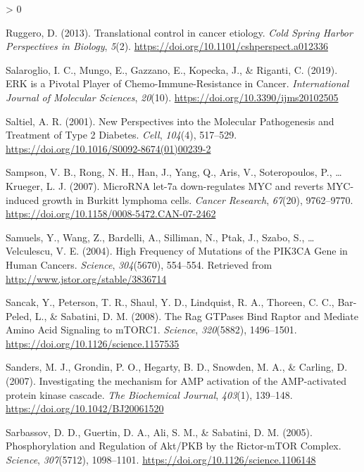 \documentclass[
  12pt,
  openany]{book}
\newlength{\cslhangindent}
\newenvironment{CSLReferences}[2] %
 {%
  \setlength{\parindent}{0pt}
  \ifodd #1 \everypar{\setlength{\hangindent}{\cslhangindent}}\ignorespaces\fi
  \ifnum #2 > 0
  \setlength{\parskip}{#2\baselineskip}
  \fi
 }%
 {}
\begin{document}
\begin{CSLReferences}{1}{0}
\leavevmode\hypertarget{ref-Ruggero2013}{}%
Ruggero, D. (2013). Translational control in cancer etiology. \emph{Cold Spring Harbor Perspectives in Biology}, \emph{5}(2). \url{https://doi.org/10.1101/cshperspect.a012336}

\leavevmode\hypertarget{ref-Salaroglio2019}{}%
Salaroglio, I. C., Mungo, E., Gazzano, E., Kopecka, J., \& Riganti, C. (2019). {ERK} is a {Pivotal Player} of {Chemo}-{Immune}-{Resistance} in {Cancer}. \emph{International Journal of Molecular Sciences}, \emph{20}(10). \url{https://doi.org/10.3390/ijms20102505}

\leavevmode\hypertarget{ref-Saltiel2001}{}%
Saltiel, A. R. (2001). New {Perspectives} into the {Molecular Pathogenesis} and {Treatment} of {Type} 2 {Diabetes}. \emph{Cell}, \emph{104}(4), 517--529. \url{https://doi.org/10.1016/S0092-8674(01)00239-2}

\leavevmode\hypertarget{ref-Sampson2007}{}%
Sampson, V. B., Rong, N. H., Han, J., Yang, Q., Aris, V., Soteropoulos, P., \ldots{} Krueger, L. J. (2007). {MicroRNA} let-7a down-regulates {MYC} and reverts {MYC}-induced growth in {Burkitt} lymphoma cells. \emph{Cancer Research}, \emph{67}(20), 9762--9770. \url{https://doi.org/10.1158/0008-5472.CAN-07-2462}

\leavevmode\hypertarget{ref-Samuels2004}{}%
Samuels, Y., Wang, Z., Bardelli, A., Silliman, N., Ptak, J., Szabo, S., \ldots{} Velculescu, V. E. (2004). High {Frequency} of {Mutations} of the {PIK3CA Gene} in {Human Cancers}. \emph{Science}, \emph{304}(5670), 554--554. Retrieved from \url{http://www.jstor.org/stable/3836714}

\leavevmode\hypertarget{ref-Sancak2008}{}%
Sancak, Y., Peterson, T. R., Shaul, Y. D., Lindquist, R. A., Thoreen, C. C., Bar-Peled, L., \& Sabatini, D. M. (2008). The {Rag GTPases Bind Raptor} and {Mediate Amino Acid Signaling} to {mTORC1}. \emph{Science}, \emph{320}(5882), 1496--1501. \url{https://doi.org/10.1126/science.1157535}

\leavevmode\hypertarget{ref-Sanders2007}{}%
Sanders, M. J., Grondin, P. O., Hegarty, B. D., Snowden, M. A., \& Carling, D. (2007). Investigating the mechanism for {AMP} activation of the {AMP}-activated protein kinase cascade. \emph{The Biochemical Journal}, \emph{403}(1), 139--148. \url{https://doi.org/10.1042/BJ20061520}

\leavevmode\hypertarget{ref-Sarbassov2005}{}%
Sarbassov, D. D., Guertin, D. A., Ali, S. M., \& Sabatini, D. M. (2005). Phosphorylation and {Regulation} of {Akt}/{PKB} by the {Rictor}-{mTOR Complex}. \emph{Science}, \emph{307}(5712), 1098--1101. \url{https://doi.org/10.1126/science.1106148}


\end{CSLReferences}
\end{document}
